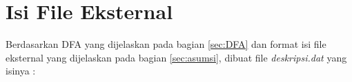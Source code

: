 \section{Isi File Eksternal}
Berdasarkan DFA yang dijelaskan pada bagian \ref{sec:DFA} dan format isi file eksternal yang dijelaskan pada bagian \ref{sec:asumsi}, dibuat file \textit{deskripsi.dat} yang isinya :

